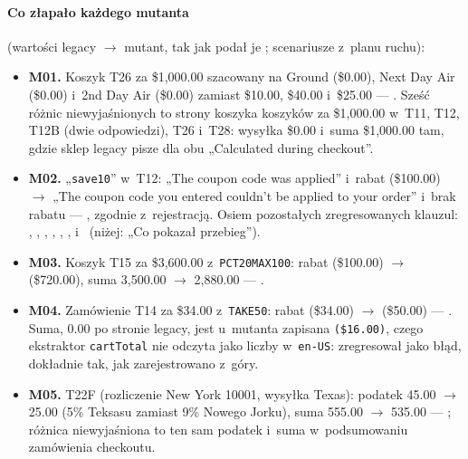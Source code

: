 \paragraph{Co złapało każdego mutanta} (wartości legacy $\rightarrow$ mutant, tak jak podał je
; scenariusze z~planu ruchu):
\begin{itemize}
  \item \textbf{M01.} Koszyk T26 za \$1,000.00 szacowany na Ground (\$0.00), Next Day Air
    (\$0.00) i~2nd Day Air (\$0.00) zamiast \$10.00, \$40.00 i~\$25.00 ---
    . Sześć różnic niewyjaśnionych to strony koszyka
    koszyków za \$1,000.00 w~T11, T12, T12B (dwie odpowiedzi), T26 i~T28: wysyłka \$0.00
    i~suma \$1,000.00 tam, gdzie sklep legacy pisze dla obu „Calculated during checkout”.
  \item \textbf{M02.} „\texttt{\textvisiblespace{}save10\textvisiblespace{}}” w~T12: „The
    coupon code was applied” i~rabat (\$100.00) $\rightarrow$ „The coupon code you entered
    couldn't be applied to your order” i~brak rabatu --- ,
    zgodnie z~rejestracją. Osiem pozostałych zregresowanych klauzul:
    , ,
    , ,
    , ,
     i~ (niżej: „Co pokazał
    przebieg”).
  \item \textbf{M03.} Koszyk T15 za \$3,600.00 z~\texttt{PCT20MAX100}: rabat (\$100.00)
    $\rightarrow$ (\$720.00), suma 3,500.00 $\rightarrow$ 2,880.00 ---
    .
  \item \textbf{M04.} Zamówienie T14 za \$34.00 z~\texttt{TAKE50}: rabat (\$34.00)
    $\rightarrow$ (\$50.00) --- . Suma, 0.00 po stronie
    legacy, jest u~mutanta zapisana \texttt{(\$16.00)}, czego ekstraktor \texttt{cartTotal}
    nie odczyta jako liczby w~\texttt{en-US}:  zregresował
    jako błąd, dokładnie tak, jak zarejestrowano z~góry.
  \item \textbf{M05.} T22F (rozliczenie New York 10001, wysyłka Texas): podatek 45.00
    $\rightarrow$ 25.00 (5\% Teksasu zamiast 9\% Nowego Jorku), suma 555.00 $\rightarrow$
    535.00 --- ; różnica niewyjaśniona to ten sam podatek
    i~suma w~podsumowaniu zamówienia checkoutu.

\end{itemize}

